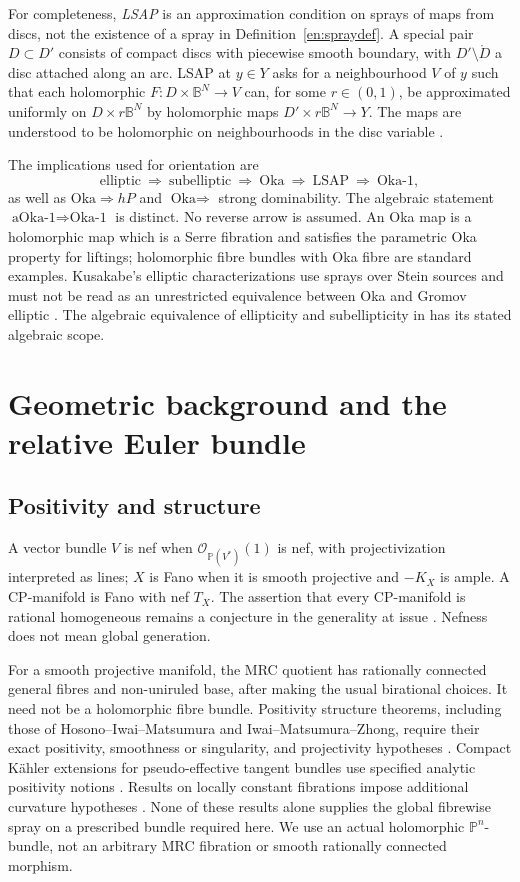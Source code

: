 \documentclass[12pt]{amsart}
\theoremstyle{definition}
\theoremstyle{remark}
\numberwithin{equation}{section}
\newcommand{\cO}{\mathcal{O}}
\newcommand{\mP}{\mathbb{P}}
\begin{document}
For completeness, \emph{LSAP} is an approximation condition on sprays of maps from discs, not the existence of a spray in Definition~\ref{en:spraydef}. A special pair $D\subset D'$ consists of compact discs with piecewise smooth boundary, with $D'\setminus\mathring D$ a disc attached along an arc. LSAP at $y\in Y$ asks for a neighbourhood $V$ of $y$ such that each holomorphic $F:D\times\mathbb B^N\to V$ can, for some $r\in(0,1)$, be approximated uniformly on $D\times r\mathbb B^N$ by holomorphic maps $D'\times r\mathbb B^N\to Y$. The maps are understood to be holomorphic on neighbourhoods in the disc variable \cite[Definitions~5.1--5.2]{en:FLone}.

The implications used for orientation are
\[
\text{elliptic}\ \Longrightarrow\ \text{subelliptic}\ \Longrightarrow\ \text{Oka}
\ \Longrightarrow\ \text{LSAP}\ \Longrightarrow\ \text{Oka-1},
\]
as well as $\text{Oka}\Rightarrow hP$ and $\text{Oka}\Rightarrow$ strong dominability. The algebraic statement $\text{aOka-1}\Rightarrow\text{Oka-1}$ is distinct. No reverse arrow is assumed. An Oka map is a holomorphic map which is a Serre fibration and satisfies the parametric Oka property for liftings; holomorphic fibre bundles with Oka fibre are standard examples. Kusakabe's elliptic characterizations use sprays over Stein sources and must not be read as an unrestricted equivalence between Oka and Gromov elliptic \cite{en:Kus21,en:Kus24}. The algebraic equivalence of ellipticity and subellipticity in \cite{en:KZ} has its stated algebraic scope.

\section{Geometric background and the relative Euler bundle}
\subsection{Positivity and structure}
A vector bundle $V$ is nef when $\cO_{\mP(V^*)}(1)$ is nef, with projectivization interpreted as lines; $X$ is Fano when it is smooth projective and $-K_X$ is ample. A CP-manifold is Fano with nef $T_X$. The assertion that every CP-manifold is rational homogeneous remains a conjecture in the generality at issue \cite{en:CP,en:DPS}. Nefness does not mean global generation.

For a smooth projective manifold, the MRC quotient has rationally connected general fibres and non-uniruled base, after making the usual birational choices. It need not be a holomorphic fibre bundle. Positivity structure theorems, including those of Hosono--Iwai--Matsumura and Iwai--Matsumura--Zhong, require their exact positivity, smoothness or singularity, and projectivity hypotheses \cite{en:HIM,en:IMZ}. Compact K\"ahler extensions for pseudo-effective tangent bundles use specified analytic positivity notions \cite{en:MQ}. Results on locally constant fibrations impose additional curvature hypotheses \cite{en:Muller}. None of these results alone supplies the global fibrewise spray on a prescribed bundle required here. We use an actual holomorphic $\mP^n$-bundle, not an arbitrary MRC fibration or smooth rationally connected morphism.
\end{document}
